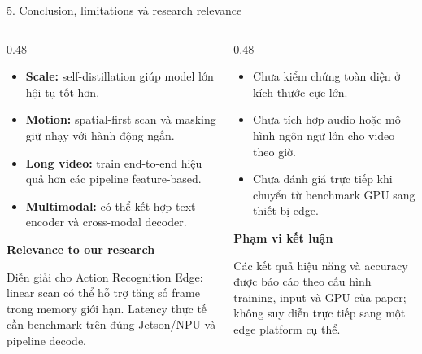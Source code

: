 \documentclass[aspectratio=169,9pt]{beamer}
\newcommand{\smallnote}[1]{{\fontsize{7.1}{8.4}\selectfont #1\par}}
\newcommand{\source}[1]{}
\newcommand{\heading}[1]{{\bfseries\color{PTITRed} #1\par}}
\newcommand{\tightitems}{\setlength{\itemsep}{0.13em}\setlength{\parskip}{0pt}\setlength{\parsep}{0pt}}
\begin{document}
\begin{frame}{5. Conclusion, limitations và research relevance}
  \vspace{0.08cm}
  \begin{columns}[T,onlytextwidth]
    \begin{column}{0.48\textwidth}
      \begin{tcolorbox}[titlepanel,title=Kết luận của bài báo,equal height group=s5_top]
        \begin{itemize}\tightitems
          \item \textbf{Scale:} self-distillation giúp model lớn hội tụ tốt hơn.
          \item \textbf{Motion:} spatial-first scan và masking giữ nhạy với hành động ngắn.
          \item \textbf{Long video:} train end-to-end hiệu quả hơn các pipeline feature-based.
          \item \textbf{Multimodal:} có thể kết hợp text encoder và cross-modal decoder.
        \end{itemize}
      \end{tcolorbox}
      \vspace{0.14cm}
      \begin{tcolorbox}[keypanel,equal height group=s5_bot]
        \heading{Relevance to our research}
        \smallnote{Diễn giải cho Action Recognition Edge: linear scan có thể hỗ trợ tăng số frame trong memory giới hạn. Latency thực tế cần benchmark trên đúng Jetson/NPU và pipeline decode.}
      \end{tcolorbox}
    \end{column}
    \begin{column}{0.48\textwidth}
      \begin{tcolorbox}[titlepanel,title=Giới hạn được tác giả nêu,equal height group=s5_top]
        \begin{itemize}\tightitems
          \item Chưa kiểm chứng toàn diện ở kích thước cực lớn.
          \item Chưa tích hợp audio hoặc mô hình ngôn ngữ lớn cho video theo giờ.
          \item Chưa đánh giá trực tiếp khi chuyển từ benchmark GPU sang thiết bị edge.
        \end{itemize}
      \end{tcolorbox}
      \vspace{0.14cm}
      \begin{tcolorbox}[greenpanel,equal height group=s5_bot]
        \heading{Phạm vi kết luận}
        \smallnote{Các kết quả hiệu năng và accuracy được báo cáo theo cấu hình training, input và GPU của paper; không suy diễn trực tiếp sang một edge platform cụ thể.}
      \end{tcolorbox}
    \end{column}
  \end{columns}
  \vfill
  \source{Nguồn: VideoMamba, Abstract, Sections 4.4--5.}
\end{frame}
\end{document}
